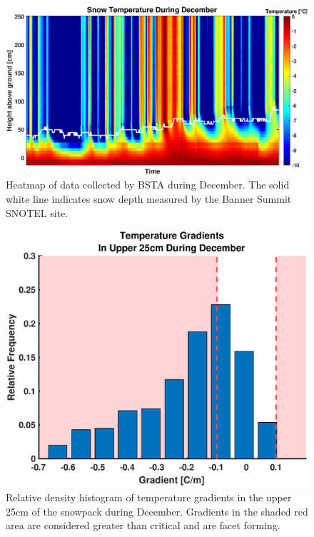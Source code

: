 \begin{figure}[H]
    \centering
    \includegraphics[width=0.95\linewidth]{figures/TempGrad/Dec_Heatmap.eps}
    \caption{Heatmap of data collected by BSTA during December. The solid white line indicates snow depth measured by the Banner Summit SNOTEL site.}
    \label{fig:Dec_U25_RDH}
 \end{figure}
 
  
  \begin{figure}[H]
    \centering
    \includegraphics[width=0.7\linewidth]{figures/TempGrad/Dec_U25_RDH.eps}
    \caption{Relative density histogram of temperature gradients in the upper 25cm of the snowpack during December. Gradients in the shaded red area are considered greater than critical and are facet forming.}
    \label{fig:Dec_Heatmap}
 \end{figure}
 

